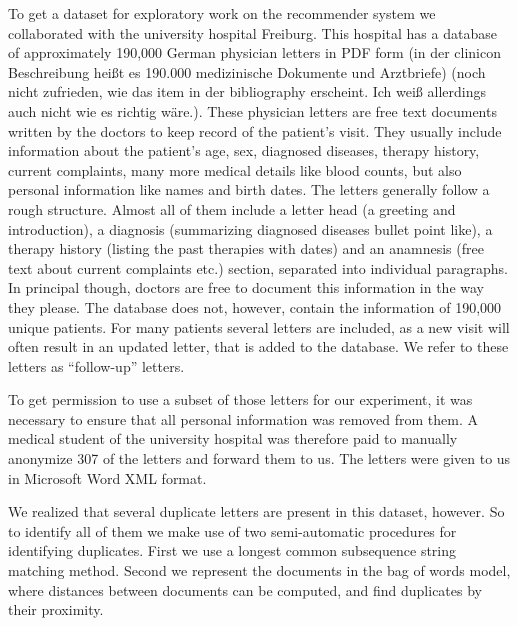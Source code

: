 To get a dataset for exploratory work on the recommender system we collaborated with the university hospital Freiburg. This hospital has a database of approximately 190,000 German
physician letters in PDF form \citep{spadaro2012} (in der clinicon Beschreibung heißt es 190.000 medizinische Dokumente und Arztbriefe) (noch nicht zufrieden, wie das item in der bibliography erscheint. Ich weiß allerdings auch nicht wie es richtig wäre.). These physician letters are free text documents
written by the doctors to keep record of the patient's visit. They
usually include information about the patient's age, sex, diagnosed
diseases, therapy history, current complaints, many more medical details
like blood counts, but also personal information like names and birth dates.
The letters generally follow a rough structure. Almost all of them include a letter head (a greeting and introduction), a diagnosis (summarizing diagnosed diseases bullet point like), a therapy history (listing the past therapies with dates) and an anamnesis (free text about current complaints etc.) section, separated into individual paragraphs. In principal though, doctors are free to document this information in the way they please. The database does not, however, contain the information of 190,000 unique patients. For many patients several letters are included, as a new visit will often result in an updated letter, that is added to the database. We refer to these letters as ``follow-up'' letters.

To get permission to use a subset of those letters for our experiment, it was necessary to ensure that all personal information was removed from them. A medical student of the university hospital was therefore paid to manually anonymize 307 of the letters and forward them to us. The letters were given to us in Microsoft Word XML format.

We realized that several duplicate letters are present in this dataset, however. So to identify all of them we make use of two semi-automatic procedures for identifying duplicates. First we use a longest common subsequence string matching method. Second we represent the documents in the bag of words model, where distances between documents can be computed, and find duplicates by their proximity.


